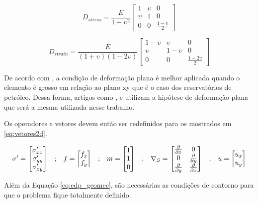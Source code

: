 \begin{equation} \label{eq:elasticplanestress}
D_{stress} = \frac{E}{1-\upsilon^2}
\begin{bmatrix}
1  & \upsilon & 0 \\ 
\upsilon & 1 &  0 \\ 
0 & 0 & \frac{1-\upsilon}{2}
\end{bmatrix}
\end{equation}

\begin{equation} \label{eq:elasticplanestrain}
D_{strain} = \frac{E}{(1+\upsilon)(1-2\upsilon)}
\begin{bmatrix}
 1-\upsilon & \upsilon    &  0 \\ 
 \upsilon   &  1-\upsilon &  0 \\ 
 0& 0 & \frac{1-2\upsilon}{2}
\end{bmatrix}
\end{equation}

De acordo com \cite{jacob}, a condição de deformação plana é melhor aplicada quando o elemento é grosso em relação ao plano xy que é o caso dos reservatórios de petróleo.  Dessa forma, artigos como \cite{planeStrainProblems}, \cite{casteletto} e \cite{irina} utilizam a hipótese de deformação plana que será a mesma utilizada nesse trabalho.

Os operadores e vetores devem então ser redefinidos para os mostrados em \eqref{eq:vetores2d}.

\begin{equation}
\label{eq:vetores2d}
\begin{matrix}
\sigma^\prime = \begin{bmatrix}
\sigma^\prime_{xx}
\\
\sigma^\prime_{yy}
\\
\sigma^\prime_{xy}
\end{bmatrix}
&

;

&

f = \begin{bmatrix}
f_{x}
\\
f_{y}
\end{bmatrix}
&
;
&

m = \begin{bmatrix} 1 \\ 1 \\ 0\end{bmatrix}

&
;

&
\nabla_S = \begin{bmatrix} \frac{\partial { }}{\partial x} & 0 \\ 0 & \frac{\partial { }}{\partial y} \\ \frac{\partial { }}{\partial y} & \frac{\partial { }}{\partial x} \\ \end{bmatrix}

&
;

&

u = \begin{bmatrix}
u_x
\\ 
u_y
\end{bmatrix}

\end{matrix}
\end{equation}

Além da Equação \eqref{eq:edp_geomec}, são necessárias as condições de contorno para que o problema fique totalmente definido. 
